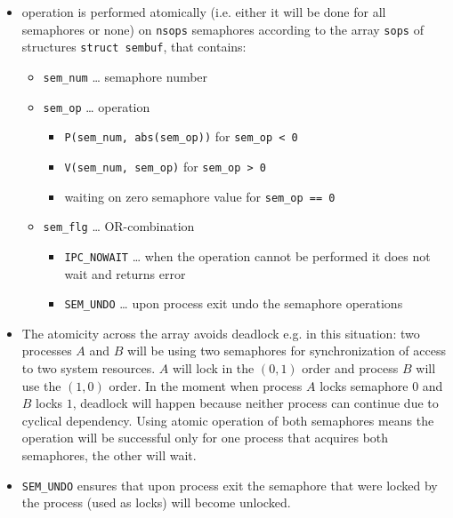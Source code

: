 \begin{slide}
\begin{itemize}
\item operation is performed atomically (i.e. either it will be done for all
semaphores or none) on \texttt{nsops} semaphores according to the array
\texttt{sops} of structures \texttt{struct~sembuf}, that contains:
    \begin{itemize}
    \item \texttt{sem\_num} \dots{} semaphore number
    \item \texttt{sem\_op} \dots{} operation
        \begin{itemize}
        \item \texttt{P(sem\_num, abs(sem\_op))} for \texttt{sem\_op < 0}
        \item \texttt{V(sem\_num, sem\_op)} for \texttt{sem\_op > 0}
        \item waiting on zero semaphore value for \texttt{sem\_op == 0} 
        \end{itemize}
    \item \texttt{sem\_flg} \dots{} OR-combination
        \begin{itemize}
        \item \texttt{IPC\_NOWAIT} \dots{} when the operation cannot be
        performed it does not wait and returns error
        \item \texttt{SEM\_UNDO} \dots{} upon process exit undo the semaphore
        operations
        \end{itemize}
    \end{itemize}
\end{itemize}
\end{slide}

\begin{itemize}
\item The atomicity across the array avoids deadlock e.g. in this situation:
two processes $A$ and $B$ will be using two semaphores for synchronization of
access to two system resources. $A$ will lock in the $(0, 1)$ order and process
$B$ will use the $(1, 0)$ order. In the moment when process $A$ locks semaphore
$0$ and $B$ locks $1$, deadlock will happen because neither process can
continue due to cyclical dependency. Using atomic operation of both semaphores
means the operation will be successful only for one process that acquires both
semaphores, the other will wait.
\item \texttt{SEM\_UNDO} ensures that upon process exit the semaphore that were
locked by the process (used as locks) will become unlocked.
\end{itemize}

